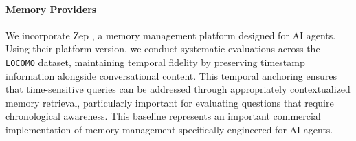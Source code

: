 \paragraph{Memory Providers} We incorporate Zep \citep{rasmussen2025zep}, a memory management platform designed for AI agents. Using their platform version, we conduct systematic evaluations across the \texttt{LOCOMO} dataset, maintaining temporal fidelity by preserving timestamp information alongside conversational content. This temporal anchoring ensures that time-sensitive queries can be addressed through appropriately contextualized memory retrieval, particularly important for evaluating questions that require chronological awareness. This baseline represents an important commercial implementation of memory management specifically engineered for AI agents.


